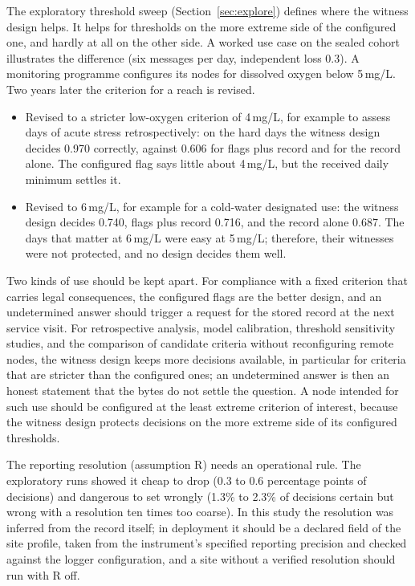 The exploratory threshold sweep (Section~\ref{sec:explore}) defines where the witness design helps. It helps for thresholds on the more extreme side of the configured one, and hardly at all on the other side. A worked use case on the sealed cohort illustrates the difference (six messages per day, independent loss 0.3). A monitoring programme configures its nodes for dissolved oxygen below 5\,mg/L. Two years later the criterion for a reach is revised.
\begin{itemize}
  \item Revised to a stricter low-oxygen criterion of 4\,mg/L, for example to assess days of acute stress retrospectively: on the hard days the witness design decides 0.970 correctly, against 0.606 for flags plus record and for the record alone. The configured flag says little about 4\,mg/L, but the received daily minimum settles it.
  \item Revised to 6\,mg/L, for example for a cold-water designated use: the witness design decides 0.740, flags plus record 0.716, and the record alone 0.687. The days that matter at 6\,mg/L were easy at 5\,mg/L; therefore, their witnesses were not protected, and no design decides them well.
\end{itemize}
Two kinds of use should be kept apart. For compliance with a fixed criterion that carries legal consequences, the configured flags are the better design, and an undetermined answer should trigger a request for the stored record at the next service visit. For retrospective analysis, model calibration, threshold sensitivity studies, and the comparison of candidate criteria without reconfiguring remote nodes, the witness design keeps more decisions available, in particular for criteria that are stricter than the configured ones; an undetermined answer is then an honest statement that the bytes do not settle the question. A node intended for such use should be configured at the least extreme criterion of interest, because the witness design protects decisions on the more extreme side of its configured thresholds.

The reporting resolution (assumption R) needs an operational rule. The exploratory runs showed it cheap to drop (0.3 to 0.6 percentage points of decisions) and dangerous to set wrongly (1.3\% to 2.3\% of decisions certain but wrong with a resolution ten times too coarse). In this study the resolution was inferred from the record itself; in deployment it should be a declared field of the site profile, taken from the instrument's specified reporting precision and checked against the logger configuration, and a site without a verified resolution should run with R off.

